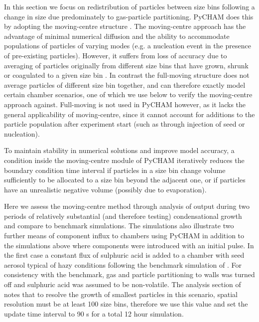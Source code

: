 \documentclass[gmd, manuscript]{copernicus}
\begin{document}
In this section we focus on redistribution of particles between size bins following a change in size due predominately to gas-particle partitioning.  PyCHAM does this by adopting the moving-centre structure \citep{Jacobson2005}.  The moving-centre approach has the advantage of minimal numerical diffusion and the ability to accommodate populations of particles of varying modes (e.g. a nucleation event in the presence of pre-existing particles).  However, it suffers from loss of accuracy due to averaging of particles originally from different size bins that have grown, shrunk or coagulated to a given size bin \citep{Zhang1999}.  In contrast the full-moving structure does not average particles of different size bin together, and can therefore exactly model certain chamber scenarios, one of which we use below to verify the moving-centre approach against.  Full-moving is not used in PyCHAM however, as it lacks the general applicability of moving-centre, since it cannot account for additions to the particle population after experiment start (such as through injection of seed or nucleation).  

To maintain stability in numerical solutions and improve model accuracy, a condition inside the moving-centre module of PyCHAM iteratively reduces the boundary condition time interval if particles in a size bin change volume sufficiently to be allocated to a size bin beyond the adjacent one, or if particles have an unrealistic negative volume (possibly due to evaporation).

Here we assess the moving-centre method through analysis of output during two periods of relatively substantial (and therefore testing) condensational growth and compare to benchmark simulations.  The simulations also illustrate two further means of component influx to chambers using PyCHAM in addition to the simulations above where components were introduced with an initial pulse.  In the first case a constant flux of sulphuric acid is added to a chamber with seed aerosol typical of hazy conditions following the benchmark simulation of \citet{Zhang1999}.  For consistency with the benchmark, gas and particle partitioning to walls was turned off and sulphuric acid was assumed to be non-volatile.  The analysis section of \citet{Zhang1999} notes that to resolve the growth of smallest particles in this scenario, spatial resolution must be at least 100 size bins, therefore we use this value and set the update time interval to 90 s for a total 12 hour simulation.  
\end{document}

